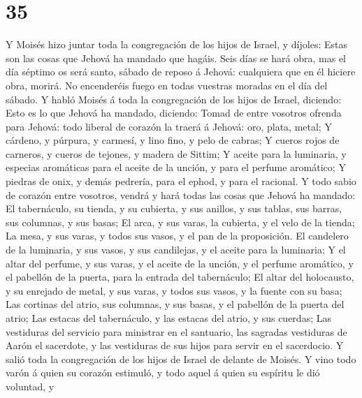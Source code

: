 \hypertarget{section-34}{%
\section{35}\label{section-34}}

 Y Moisés hizo juntar toda la congregación de los hijos de
Israel, y díjoles: Estas son las cosas que Jehová ha mandado que hagáis.
 Seis días se hará obra, mas el día séptimo os será santo,
sábado de reposo á Jehová: cualquiera que en él hiciere obra, morirá.
 No encenderéis fuego en todas vuestras moradas en el día
del sábado.  Y habló Moisés á toda la congregación de los
hijos de Israel, diciendo: Esto es lo que Jehová ha mandado, diciendo:
 Tomad de entre vosotros ofrenda para Jehová: todo liberal
de corazón la traerá á Jehová: oro, plata, metal;  Y
cárdeno, y púrpura, y carmesí, y lino fino, y pelo de cabras;
 Y cueros rojos de carneros, y cueros de tejones, y madera
de Sittim;  Y aceite para la luminaria, y especias
aromáticas para el aceite de la unción, y para el perfume aromático;
 Y piedras de onix, y demás pedrería, para el ephod, y
para el racional.  Y todo sabio de corazón entre
vosotros, vendrá y hará todas las cosas que Jehová ha mandado:
 El tabernáculo, su tienda, y su cubierta, y sus anillos,
y sus tablas, sus barras, sus columnas, y sus basas;  El
arca, y sus varas, la cubierta, y el velo de la tienda; 
La mesa, y sus varas, y todos sus vasos, y el pan de la proposición.
 El candelero de la luminaria, y sus vasos, y sus
candilejas, y el aceite para la luminaria;  Y el altar
del perfume, y sus varas, y el aceite de la unción, y el perfume
aromático, y el pabellón de la puerta, para la entrada del tabernáculo;
 El altar del holocausto, y su enrejado de metal, y sus
varas, y todos sus vasos, y la fuente con su basa;  Las
cortinas del atrio, sus columnas, y sus basas, y el pabellón de la
puerta del atrio;  Las estacas del tabernáculo, y las
estacas del atrio, y sus cuerdas;  Las vestiduras del
servicio para ministrar en el santuario, las sagradas vestiduras de
Aarón el sacerdote, y las vestiduras de sus hijos para servir en el
sacerdocio.  Y salió toda la congregación de los hijos de
Israel de delante de Moisés.  Y vino todo varón á quien
su corazón estimuló, y todo aquel á quien su espíritu le dió voluntad, y
